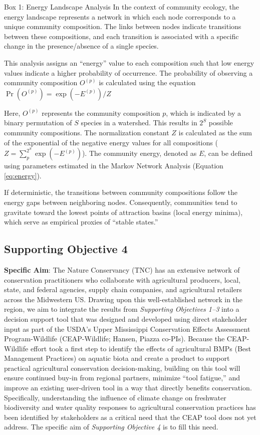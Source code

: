 \documentclass[12pt, class=article, crop=false]{standalone}
\begin{document}
\begin{tcolorbox}[parbox=false, breakable]
    Box 1: Energy Landscape Analysis
    \tcblower
    In the context of community ecology, the energy landscape represents a network in which each node corresponds to a unique community composition.
    The links between nodes indicate transitions between these compositions, and each transition is associated with a specific change in the presence/absence of a single species.

    This analysis assigns an ``energy'' value to each composition such that low energy values indicate a higher probability of occurrence.
    The probability of observing a community composition $O^{(p)}$ is calculated using the equation $\Pr(O^{(p)}) = \exp(-E^{(p)})/Z$
    
    Here, $O^{(p)}$ represents the community composition $p$, which is indicated by a binary permutation of $S$ species in a watershed.
    This results in $2^S$ possible community compositions. The normalization constant $Z$ is calculated as the sum of the exponential of the negative energy values for all compositions ($Z = \sum_p^{2^S} \exp(-E^{(p)})$).
    The community energy, denoted as $E$, can be defined using parameters estimated in the Markov Network Analysis (Equation \ref{eq:energy}).
    
    If deterministic, the transitions between community compositions follow the energy gaps between neighboring nodes.
    Consequently, communities tend to gravitate toward the lowest points of attraction basins (local energy minima), which serve as empirical proxies of ``stable states.''
\end{tcolorbox}

\subsection{Supporting Objective 4}

\textbf{Specific Aim}: The Nature Conservancy (TNC) has an extensive network of conservation practitioners who collaborate with agricultural producers, local, state, and federal agencies, supply chain companies, and agricultural retailers across the Midwestern US.
Drawing upon this well-established network in the region, we aim to integrate the results from \textit{Supporting Objectives 1--3} into a decision support tool that was designed and developed using direct stakeholder input as part of the USDA's Upper Mississippi Conservation Effects Assessment Program-Wildlife (CEAP-Wildlife; Hansen, Piazza co-PIs).
Because the CEAP-Wildlife effort took a first step to identify the effects of agricultural BMPs (Best Management Practices) on aquatic biota and create a product to support practical agricultural conservation decision-making, building on this tool will ensure continued buy-in from regional partners, minimize ``tool fatigue,'' and improve an existing user-driven tool in a way that directly benefits conservation.
Specifically, understanding the influence of climate change on freshwater biodiversity and water quality responses to agricultural conservation practices has been identified by stakeholders as a critical need that the CEAP tool does not yet address. The specific aim of \textit{Supporting Objective 4} is to fill this need.
\end{document}
